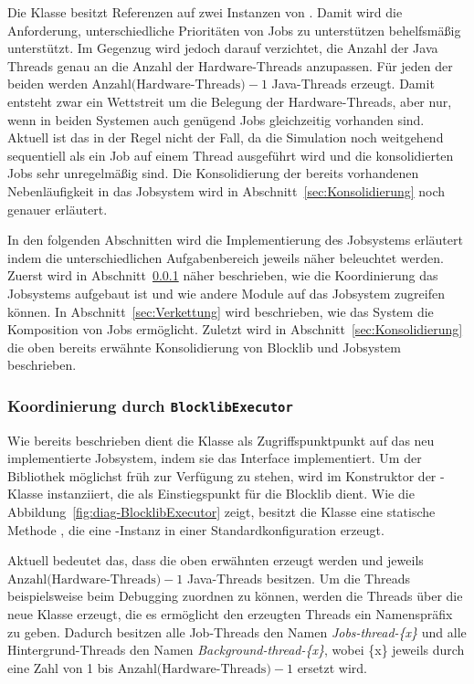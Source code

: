 Die Klasse besitzt Referenzen auf zwei Instanzen von . Damit wird die Anforderung, unterschiedliche Prioritäten von Jobs zu unterstützen behelfsmäßig unterstützt. Im Gegenzug wird jedoch darauf verzichtet, die Anzahl der Java Threads genau an die Anzahl der Hardware-Threads anzupassen. Für jeden der beiden  werden $\text{Anzahl(Hardware-Threads)} - 1$ Java-Threads erzeugt. Damit entsteht zwar ein Wettstreit um die Belegung der Hardware-Threads, aber nur, wenn in beiden Systemen auch genügend Jobs gleichzeitig vorhanden sind. Aktuell ist das in der Regel nicht der Fall, da die Simulation noch weitgehend sequentiell als ein Job auf einem Thread ausgeführt wird und die konsolidierten Jobs sehr unregelmäßig sind. Die Konsolidierung der bereits vorhandenen Nebenläufigkeit in das Jobsystem wird in Abschnitt~\ref{sec:Konsolidierung} noch genauer erläutert. 

In den folgenden Abschnitten wird die Implementierung des Jobsystems erläutert indem die unterschiedlichen Aufgabenbereich jeweils näher beleuchtet werden. Zuerst wird in Abschnitt~\ref{sec:Koordinierung} näher beschrieben, wie die Koordinierung das Jobsystems aufgebaut ist und wie andere Module auf das Jobsystem zugreifen können. In Abschnitt~\ref{sec:Verkettung} wird beschrieben, wie das System die Komposition von Jobs ermöglicht. Zuletzt wird in Abschnitt~\ref{sec:Konsolidierung} die oben bereits erwähnte Konsolidierung von Blocklib und Jobsystem beschrieben.

\subsubsection{Koordinierung durch \texttt{BlocklibExecutor}}\label{sec:Koordinierung}

Wie bereits beschrieben dient die Klasse  als Zugriffspunktpunkt auf das neu implementierte Jobsystem, indem sie das Interface  implementiert. Um der Bibliothek möglichst früh zur Verfügung zu stehen, wird  im Konstruktor der -Klasse instanziiert, die als Einstiegspunkt für die Blocklib dient. Wie die Abbildung~\vref{fig:diag-BlocklibExecutor} zeigt, besitzt die Klasse  eine statische Methode , die eine -Instanz in einer Standardkonfiguration erzeugt.

Aktuell bedeutet das, dass die oben erwähnten  erzeugt werden und jeweils $\text{Anzahl(Hardware-Threads)} - 1$ Java-Threads besitzen. Um die Threads beispielsweise beim Debugging zuordnen zu können, werden die Threads über die neue Klasse  erzeugt, die es ermöglicht den erzeugten Threads ein Namenspräfix zu geben. Dadurch besitzen alle Job-Threads den Namen \emph{Jobs-thread-\{x\}} und alle Hintergrund-Threads den Namen \emph{Background-thread-\{x\}}, wobei \{x\} jeweils durch eine Zahl von 1 bis $\text{Anzahl(Hardware-Threads)} - 1$ ersetzt wird.

